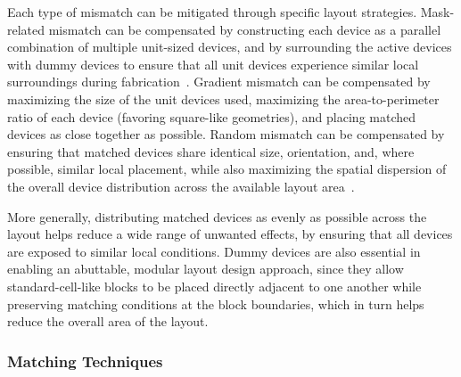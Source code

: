 Each type of mismatch can be mitigated through specific layout strategies. Mask-related mismatch can be compensated by constructing each device as a parallel combination of multiple unit-sized devices, and by surrounding the active devices with dummy devices to ensure that all unit devices experience similar local surroundings during fabrication~\cite{layout_fundamentals, ndjountche2011_highspeed}. Gradient mismatch can be compensated by maximizing the size of the unit devices used, maximizing the area-to-perimeter ratio of each device (favoring square-like geometries), and placing matched devices as close together as possible. Random mismatch can be compensated by ensuring that matched devices share identical size, orientation, and, where possible, similar local placement, while also maximizing the spatial dispersion of the overall device distribution across the available layout area~\cite{layout_fundamentals,razavi,ndjountche2011_highspeed}.

More generally, distributing matched devices as evenly as possible across the layout helps reduce a wide range of unwanted effects, by ensuring that all devices are exposed to similar local conditions. Dummy devices are also essential in enabling an abuttable, modular layout design approach, since they allow standard-cell-like blocks to be placed directly adjacent to one another while preserving matching conditions at the block boundaries, which in turn helps reduce the overall area of the layout.

\subsubsection{Matching Techniques}\label{sec:matching_techniques}

